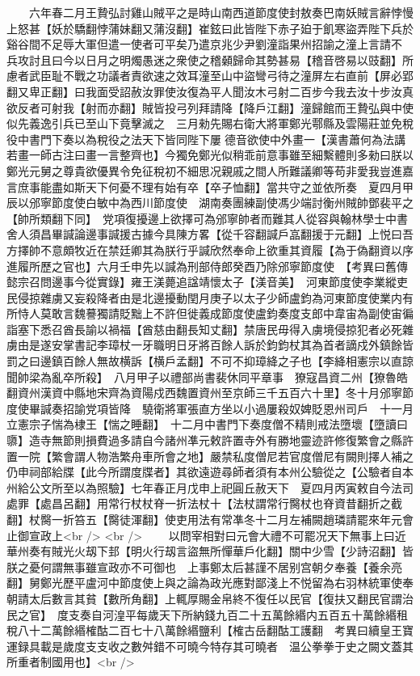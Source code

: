 　　六年春二月王贄弘討雞山賊平之是時山南西道節度使封敖奏巴南妖賊言辭悖慢上怒甚【妖於驕翻悖蒲妹翻又蒲沒翻】崔鉉曰此皆陛下赤子廹于飢寒盜弄陛下兵於谿谷間不足辱大軍但遣一使者可平矣乃遣京兆少尹劉潼詣果州招諭之潼上言請不兵攻討且曰今以日月之明燭愚迷之衆使之稽顙歸命其勢甚易【稽音啓易以豉翻】所慮者武臣耻不戰之功議者責欲速之效耳潼至山中盜彎弓待之潼屏左右直前【屏必郢翻又卑正翻】曰我面受詔赦汝罪使汝復為平人聞汝木弓射二百步今我去汝十步汝真欲反者可射我【射而亦翻】賊皆投弓列拜請降【降戶江翻】潼歸館而王贄弘與中使似先義逸引兵已至山下竟擊滅之　三月勑先賜右衛大將軍鄭光鄠縣及雲陽莊並免稅役中書門下奏以為稅役之法天下皆同陛下屢德音欲使中外畫一【漢書蕭何為法講若畫一師古注曰畫一言整齊也】今獨免鄭光似稍乖前意事雖至細繫體則多勑曰朕以鄭光元舅之尊貴欲優異令免征稅初不細思况親戚之間人所難議卿等苟非愛我豈進嘉言庶事能盡如斯天下何憂不理有始有卒【卒子恤翻】當共守之並依所奏　夏四月甲辰以邠寧節度使白敏中為西川節度使　湖南奏團練副使馮少端討衡州賊帥鄧裴平之【帥所類翻下同】　党項復擾邊上欲擇可為邠寧帥者而難其人從容與翰林學士中書舍人須昌畢諴論邊事諴援古據今具陳方畧【從千容翻諴戶嵓翻援于元翻】上悦曰吾方擇帥不意頗牧近在禁廷卿其為朕行乎諴欣然奉命上欲重其資履【為于偽翻資以序進履所歷之官也】六月壬申先以諴為刑部侍郎癸酉乃除邠寧節度使　【考異曰舊傳懿宗召問邊事今從實錄】雍王渼薨追諡靖懷太子【渼音美】　河東節度使李業縱吏民侵掠雜虜又妄殺降者由是北邊擾動閏月庚子以太子少師盧鈞為河東節度使業内有所恃人莫敢言魏謩獨請貶黜上不許但徙義成節度使盧鈞奏度支郎中韋宙為副使宙徧詣塞下悉召酋長諭以禍福【酋慈由翻長知丈翻】禁唐民毋得入虜境侵掠犯者必死雜虜由是遂安掌書記李璋杖一牙職明日牙將百餘人訴於鈞鈞杖其為首者謫戍外鎮餘皆罰之曰邊鎮百餘人無故横訴【横戶孟翻】不可不抑璋絳之子也【李絳相憲宗以直諒聞帥梁為亂卒所殺】　八月甲子以禮部尚書裴休同平章事　獠寇昌資二州【獠魯皓翻資州漢資中縣地宋齊為資陽戍西魏置資州至京師三千五百六十里】冬十月邠寧節度使畢諴奏招諭党項皆降　驍衛將軍張直方坐以小過屢殺奴婢貶恩州司戶　十一月立憲宗子惴為棣王【惴之睡翻】　十二月中書門下奏度僧不精則戒法墮壞【墮讀曰隳】造寺無節則損費過多請自今諸州凖元敕許置寺外有勝地靈迹許修復繁會之縣許置一院【繁會謂人物浩繁舟車所會之地】嚴禁私度僧尼若官度僧尼有闕則擇人補之仍申祠部給牒【此今所謂度牒者】其欲遠遊尋師者須有本州公驗從之【公驗者自本州給公文所至以為照驗】七年春正月戊申上祀圓丘赦天下　夏四月丙寅敕自今法司處罪【處昌呂翻】用常行杖杖脊一折法杖十【法杖謂常行臋杖也脊資昔翻折之截翻】杖臋一折笞五【臋徒渾翻】使吏用法有常凖冬十二月左補闕趙璘請罷來年元會止御宣政上<br />
<br />
　　以問宰相對曰元會大禮不可罷况天下無事上曰近華州奏有賊光火刼下邽【明火行刼言盜無所憚華戶化翻】關中少雪【少詩沼翻】皆朕之憂何謂無事雖宣政亦不可御也　上事鄭太后甚謹不居别宫朝夕奉養【養余亮翻】舅鄭光歷平盧河中節度使上與之論為政光應對鄙淺上不悦留為右羽林統軍使奉朝請太后數言其貧【數所角翻】上輒厚賜金帛終不復任以民官【復扶又翻民官謂治民之官】　度支奏自河湟平每歲天下所納錢九百二十五萬餘緡内五百五十萬餘緡租稅八十二萬餘緡榷酤二百七十八萬餘緡鹽利【榷古岳翻酤工護翻　考異曰續皇王寶運録具載是歲度支支收之數舛錯不可曉今特存其可曉者　温公拳拳于史之闕文蓋其所重者制國用也】<br />

